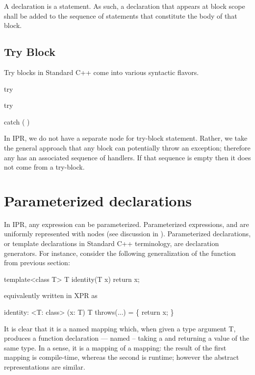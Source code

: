 \documentclass[11pt]{article}
\begin{document}
A declaration is a statement.  As such, a declaration that appears at block
scope shall be added to the sequence of statements that constitute the body of
that block.  

\subsection{Try Block}
\label{sec:stmt.try-block}
Try blocks in Standard C++ come into various syntactic flavors.
\begin{Grammar}
     try  

     try   

      

     catch (  ) 
\end{Grammar}

In IPR, we do not have a separate node for try-block statement.  Rather, we
take the general approach that any block can potentially throw an exception;
therefore any  has an associated sequence of handlers.
If that sequence is empty then it does not come from a try-block.  


\section{Parameterized declarations}
\label{sec:decls:parameterized}

In IPR, any expression can be parameterized.  Parameterized expressions, and
are uniformly represented with  nodes (see discussion
in ).  Parameterized declarations, or template
declarations in Standard C++ terminology, are declaration generators. 
For instance, consider the following generalization of the function
 from previous section:
\begin{Program}
  template<class T>
    T identity(T x) 
    { return x; }
\end{Program}
equivalently written in XPR as
\begin{Program}
  identity: <T: class> (x: T) T throws(...) = \{
     return x;
  \}
\end{Program}
It is clear that it is a named mapping which, when given a type argument
T, produces a function declaration --- named  -- taking a
 and returning a value of the same type.  In a sense, it is a mapping
of a mapping: the result of the first mapping is compile-time, whereas the
second is runtime; however the abstract representations are similar.
\end{document}
